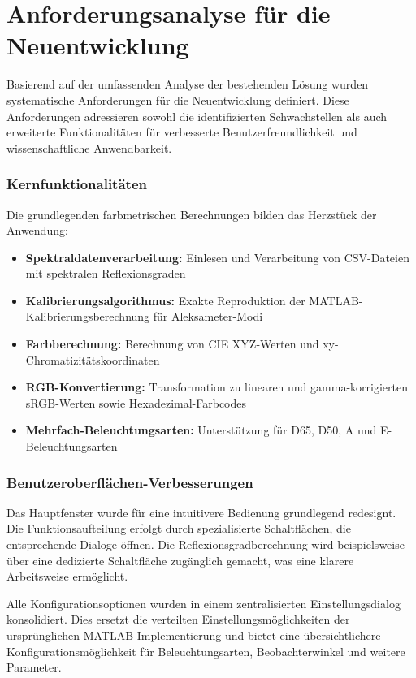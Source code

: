 \section{Anforderungsanalyse für die Neuentwicklung}

Basierend auf der umfassenden Analyse der bestehenden Lösung wurden systematische Anforderungen für die Neuentwicklung definiert. Diese Anforderungen adressieren sowohl die identifizierten Schwachstellen als auch erweiterte Funktionalitäten für verbesserte Benutzerfreundlichkeit und wissenschaftliche Anwendbarkeit.

\subsubsection{Kernfunktionalitäten}

Die grundlegenden farbmetrischen Berechnungen bilden das Herzstück der Anwendung:

\begin{itemize}
    \item \textbf{Spektraldatenverarbeitung:} Einlesen und Verarbeitung von CSV-Dateien mit spektralen Reflexionsgraden
    \item \textbf{Kalibrierungsalgorithmus:} Exakte Reproduktion der MATLAB-Kalibrierungsberechnung für Aleksameter-Modi
    \item \textbf{Farbberechnung:} Berechnung von CIE XYZ-Werten und xy-Chromatizitätskoordinaten
    \item \textbf{RGB-Konvertierung:} Transformation zu linearen und gamma-korrigierten sRGB-Werten sowie Hexadezimal-Farbcodes
    \item \textbf{Mehrfach-Beleuchtungsarten:} Unterstützung für D65, D50, A und E-Beleuchtungsarten
\end{itemize}

\subsubsection{Benutzeroberflächen-Verbesserungen}

Das Hauptfenster wurde für eine intuitivere Bedienung grundlegend redesignt. Die Funktionsaufteilung erfolgt durch spezialisierte Schaltflächen, die entsprechende Dialoge öffnen. Die Reflexionsgradberechnung wird beispielsweise über eine dedizierte Schaltfläche zugänglich gemacht, was eine klarere Arbeitsweise ermöglicht.

Alle Konfigurationsoptionen wurden in einem zentralisierten Einstellungsdialog konsolidiert. Dies ersetzt die verteilten Einstellungsmöglichkeiten der ursprünglichen MATLAB-Implementierung und bietet eine übersichtlichere Konfigurationsmöglichkeit für Beleuchtungsarten, Beobachterwinkel und weitere Parameter.

